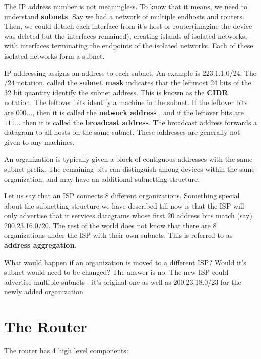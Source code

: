 \documentclass[12pt,letterpaper]{book}
\theoremstyle{definition}
\begin{document}
The IP address number is not meaningless. To know that it means, we need to understand \textbf{subnets}. Say we had a network of multiple endhosts and routers. Then, we could detach each interface from it's host or router(imagine the device was deleted but the interfaces remained), creating islands of isolated networks, with interfaces terminating the endpoints of the isolated networks. Each of these isolated networks form a subnet.

IP addressing assigns an address to each subnet. An example is 223.1.1.0/24. The /24 notation, called the \textbf{subnet mask} indicates that the leftmost 24 bits of the 32 bit quantity identify the subnet address. This is known as the \textbf{CIDR} notation. The leftover bits identify a machine in the subnet. If the leftover bits are $000...$, then it is called the \textbf{network address} , and if the leftover bits are $111...$ then it is called the \textbf{broadcast address}. The broadcast address forwards a datagram to all hosts on the same subnet. These addresses are generally not given to any machines.

An organization is typically given a block of contiguous addresses with the same subnet prefix. The remaining bits can distinguish among devices within the same organization, and may have an additional subnetting structure.

Let us say that an ISP connects 8 different organizations. Something special about the subnetting structure we have described till now is that the ISP will only advertise that it services datagrams whose first 20 address bits match (say) 200.23.16.0/20. The rest of the world does not know that there are 8 organizations under the ISP with their own subnets. This is referred to as \textbf{address aggregation}. 

What would happen if an organization is moved to a different ISP? Would it's subnet would need to be changed? The answer is no. The new ISP could advertise multiple subnets - it's original one as well as 200.23.18.0/23 for the newly added organization.

\section{The Router}

The router has 4 high level components:
\end{document}
